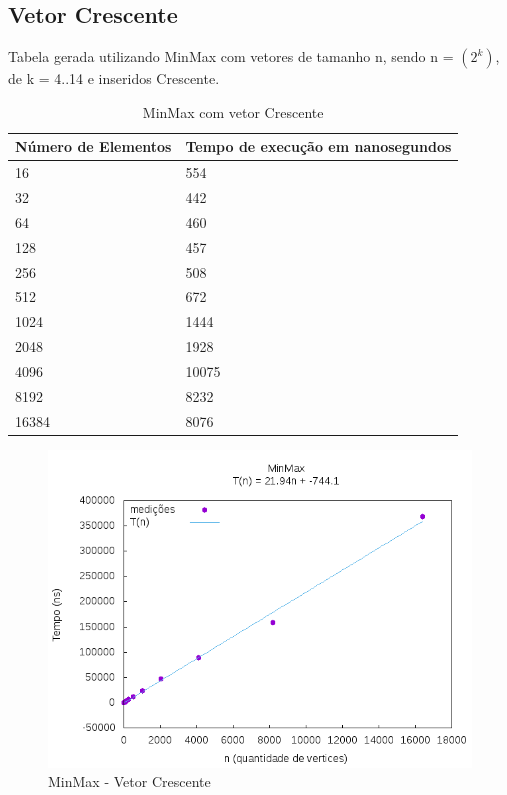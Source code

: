 \documentclass[12pt,a4paper,twoside]{report}
\begin{document}
\subsection{Vetor Crescente}
Tabela gerada utilizando MinMax com vetores de tamanho n, sendo n = $(2^k)$, de k = 4..14 e inseridos Crescente.
\begin{table}[H]
\centering
\caption{MinMax com vetor Crescente}
\label{my-label}
\begin{tabular}{|l|l|}
\hline
\multicolumn{1}{|c|}{\textbf{Número de Elementos}} & \multicolumn{1}{c|}{\textbf{Tempo de execução em nanosegundos}} \\ \hline
16 & 554 \\ \hline
32 & 442 \\ \hline
64 & 460 \\ \hline
128 & 457 \\ \hline
256 & 508 \\ \hline
512 & 672 \\ \hline
1024 & 1444 \\ \hline
2048 & 1928 \\ \hline
4096 & 10075 \\ \hline
8192 & 8232 \\ \hline
16384 & 8076 \\ \hline
\end{tabular}
\end{table}

\begin{figure}[H]
    \centering
    \includegraphics[width=0.7\linewidth]{graficos/Min Max/Crescente/MinMax.png}
  \caption{MinMax - Vetor Crescente}
\end{figure}
\end{document}

